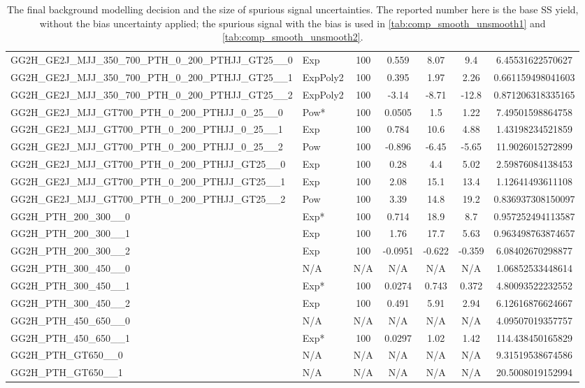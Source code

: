 \begin{table}[!h]
{\begin{tabular}{llccccS[table-format = 3.2, round-mode = places, round-precision = 2]}
 GG2H\_GE2J\_MJJ\_350\_700\_PTH\_0\_200\_PTHJJ\_GT25\_\_0 &Exp&100&0.559&8.07&9.4&6.45531622570627\\
 GG2H\_GE2J\_MJJ\_350\_700\_PTH\_0\_200\_PTHJJ\_GT25\_\_1 &ExpPoly2&100&0.395&1.97&2.26&0.661159498041603\\
 GG2H\_GE2J\_MJJ\_350\_700\_PTH\_0\_200\_PTHJJ\_GT25\_\_2 &ExpPoly2&100&-3.14&-8.71&-12.8&0.871206318335165\\
 GG2H\_GE2J\_MJJ\_GT700\_PTH\_0\_200\_PTHJJ\_0\_25\_\_0 &Pow*&100&0.0505&1.5&1.22&7.49501598864758\\
 GG2H\_GE2J\_MJJ\_GT700\_PTH\_0\_200\_PTHJJ\_0\_25\_\_1 &Exp&100&0.784&10.6&4.88&1.43198234521859\\
 GG2H\_GE2J\_MJJ\_GT700\_PTH\_0\_200\_PTHJJ\_0\_25\_\_2 &Pow&100&-0.896&-6.45&-5.65&11.9026015272899\\
 GG2H\_GE2J\_MJJ\_GT700\_PTH\_0\_200\_PTHJJ\_GT25\_\_0 &Exp&100&0.28&4.4&5.02&2.59876084138453\\
 GG2H\_GE2J\_MJJ\_GT700\_PTH\_0\_200\_PTHJJ\_GT25\_\_1 &Exp&100&2.08&15.1&13.4&1.12641493611108\\
 GG2H\_GE2J\_MJJ\_GT700\_PTH\_0\_200\_PTHJJ\_GT25\_\_2 &Pow&100&3.39&14.8&19.2&0.836937308150097\\
 GG2H\_PTH\_200\_300\_\_0 &Exp*&100&0.714&18.9&8.7&0.957252494113587\\
 GG2H\_PTH\_200\_300\_\_1 &Exp&100&1.76&17.7&5.63&0.963498763874657\\
 GG2H\_PTH\_200\_300\_\_2 &Exp&100&-0.0951&-0.622&-0.359&6.08402670298877\\
 GG2H\_PTH\_300\_450\_\_0 &N/A&N/A&N/A&N/A&N/A&1.06852533448614\\
 GG2H\_PTH\_300\_450\_\_1 &Exp*&100&0.0274&0.743&0.372&4.80093522232552\\
 GG2H\_PTH\_300\_450\_\_2 &Exp&100&0.491&5.91&2.94&6.12616876624667\\
 GG2H\_PTH\_450\_650\_\_0 &N/A&N/A&N/A&N/A&N/A&4.09507019357757\\
 GG2H\_PTH\_450\_650\_\_1 &Exp*&100&0.0297&1.02&1.42&114.438450165829\\
 GG2H\_PTH\_GT650\_\_0 &N/A&N/A&N/A&N/A&N/A&9.31519538674586\\
 GG2H\_PTH\_GT650\_\_1 &N/A&N/A&N/A&N/A&N/A&20.5008019152994\\
    \hline
      \hline
      \end{tabular}
}
      \caption{
The final background modelling decision and the size of spurious signal uncertainties. The reported number here is the base SS yield, without the bias uncertainty applied; the spurious signal with the bias is used in \ref{tab:comp_smooth_unsmooth1} and \ref{tab:comp_smooth_unsmooth2}.
}
\end{table}
